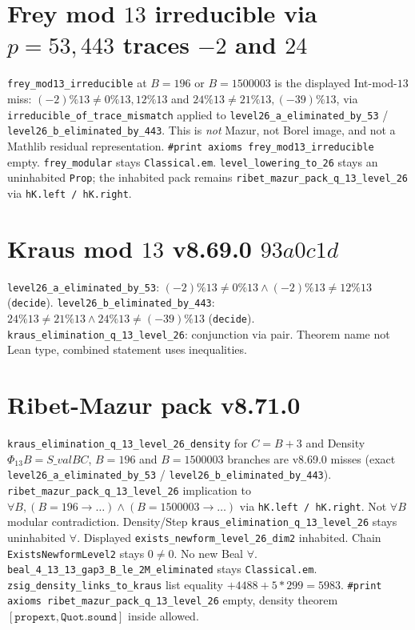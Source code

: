 \documentclass[12pt]{amsart}
\begin{document}
\section{Frey mod $13$ irreducible via $p=53,443$ traces $-2$ and $24$}
\texttt{frey\_mod13\_irreducible} at $B=196$ or $B=1500003$ is the displayed
Int-mod-$13$ miss: $(-2)\%13\neq0\%13,12\%13$ and $24\%13\neq21\%13,(-39)\%13$,
via \texttt{irreducible\_of\_trace\_mismatch} applied to
\texttt{level26\_a\_eliminated\_by\_53} / \texttt{level26\_b\_eliminated\_by\_443}.
This is \emph{not} Mazur, not Borel image, and not a Mathlib residual representation.
\texttt{\#print axioms frey\_mod13\_irreducible} empty.
\texttt{frey\_modular} stays \texttt{Classical.em}.
\texttt{level\_lowering\_to\_26} stays an uninhabited \texttt{Prop};
the inhabited pack remains \texttt{ribet\_mazur\_pack\_q\_13\_level\_26} via
\texttt{hK.left / hK.right}.

\section{Kraus mod $13$ v8.69.0 $93a0c1d$}
\texttt{level26\_a\_eliminated\_by\_53}: $(-2)\%13\neq0\%13\wedge(-2)\%13\neq12\%13$ (\texttt{decide}).
\texttt{level26\_b\_eliminated\_by\_443}: $24\%13\neq21\%13\wedge24\%13\neq(-39)\%13$ (\texttt{decide}).
\texttt{kraus\_elimination\_q\_13\_level\_26}: conjunction via pair.
Theorem name not Lean type, combined statement uses inequalities.

\section{Ribet-Mazur pack v8.71.0}
\texttt{kraus\_elimination\_q\_13\_level\_26\_density} for $C=B+3$ and Density
$\Phi_{13}B=S\_val B C$, $B=196$ and $B=1500003$ branches are v8.69.0 misses
(exact \texttt{level26\_a\_eliminated\_by\_53} / \texttt{level26\_b\_eliminated\_by\_443}).
\texttt{ribet\_mazur\_pack\_q\_13\_level\_26} implication to
$\forall B,(B=196\to\ldots)\wedge(B=1500003\to\ldots)$ via \texttt{hK.left / hK.right}.
Not $\forall B$ modular contradiction. Density/Step
\texttt{kraus\_elimination\_q\_13\_level\_26} stays uninhabited $\forall$.
Displayed \texttt{exists\_newform\_level\_26\_dim2} inhabited.
Chain \texttt{ExistsNewformLevel2} stays $0\neq0$. No new Beal $\forall$.
\texttt{beal\_4\_13\_13\_gap3\_B\_le\_2M\_eliminated} stays \texttt{Classical.em}.
\texttt{zsig\_density\_links\_to\_kraus} list equality $+4488+5*299=5983$.
\texttt{\#print axioms ribet\_mazur\_pack\_q\_13\_level\_26} empty, density theorem
$[\texttt{propext},\texttt{Quot.sound}]$ inside allowed.
\end{document}
